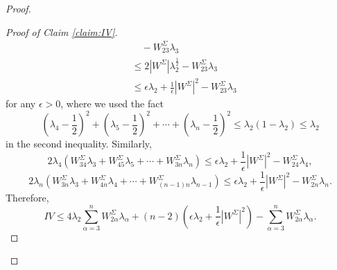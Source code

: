 \documentclass[10pt,a4paper]{amsart}
\begin{document}
\begin{proof}
\begin{proof}[Proof of Claim \ref{claim:IV}]
\begin{align*}
			&\quad - W^{\Sigma}_{23}\lambda_{3} \\
			&\leq 2|W^{\Sigma}|\lambda_2^{\frac{1}{2}} - W^{\Sigma}_{23}\lambda_{3} \\
			&\leq \epsilon\lambda_2 + \frac{1}{\epsilon}|W^{\Sigma}|^2 - W^{\Sigma}_{23}\lambda_{3}
		\end{align*}
		for any $\epsilon > 0$, where we used the fact
		\[
		\left(\lambda_{4} - \frac{1}{2}\right)^2 + \left(\lambda_{5} - \frac{1}{2}\right)^2 + \cdots + \left(\lambda_{n} - \frac{1}{2}\right)^2 \leq \lambda_2(1-\lambda_2) \leq \lambda_2
		\]
		in the second inequality. Similarly,
		\[
		2\lambda_4(W^{\Sigma}_{34}\lambda_{3} + W^{\Sigma}_{45}\lambda_{5} + \cdots + W^{\Sigma}_{3n}\lambda_{n}) \leq \epsilon\lambda_2 + \frac{1}{\epsilon}|W^{\Sigma}|^2 - W^{\Sigma}_{24}\lambda_{4},
		\]
		\[
		2\lambda_n(W^{\Sigma}_{3n}\lambda_{3} + W^{\Sigma}_{4n}\lambda_{4} + \cdots + W^{\Sigma}_{(n-1)n}\lambda_{n-1}) \leq \epsilon\lambda_2 + \frac{1}{\epsilon}|W^{\Sigma}|^2 - W^{\Sigma}_{2n}\lambda_{n}.
		\]
		Therefore,
		\[
		IV \leq 4\lambda_{2}\sum_{\alpha=3}^n W^{\Sigma}_{2\alpha}\lambda_{\alpha} + (n-2)\left(\epsilon\lambda_2 + \frac{1}{\epsilon}|W^{\Sigma}|^2\right) - \sum_{\alpha=3}^n W^{\Sigma}_{2\alpha}\lambda_{\alpha}.
		\]
		

\end{proof}
\end{proof}
\end{document}
